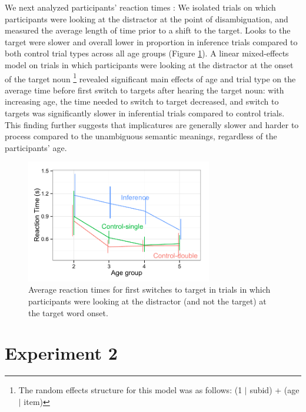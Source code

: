 \documentclass[10pt,letterpaper]{article}
\begin{document}
We next analyzed participants' reaction times \cite{fernald2008looking}: We isolated trials on which participants were looking at the distractor at the point of disambiguation, and measured the average length of time prior to a shift to the target. Looks to the target were slower and overall lower in proportion in inference trials compared to both control trial types across all age groups (Figure \ref{fig:rt}). A linear mixed-effects model on trials in which participants were looking at the distractor at the onset of the target noun \footnote{The random effects structure for this model was as follows: (1 $|$ subid) + (age $|$ item)} revealed significant main effects of age and trial type on the average time before first switch to targets after hearing the target noun: with increasing age, the time needed to switch to target decreased, and switch to targets was significantly slower in inferential trials compared to control trials. This finding further suggests that implicatures are generally slower and harder to process compared to the unambiguous semantic meanings, regardless of the participants' age. 

\begin{figure}
\begin{centering} 
\includegraphics[width=3.2in]{figures/simpimp0-rt_age.pdf}
\caption{\label{fig:rt} Average reaction times for first switches to target in trials in which participants were looking at the distractor (and not the target) at the target word onset.}
\end{centering} 
\end{figure}


\section{Experiment 2}
\end{document}
